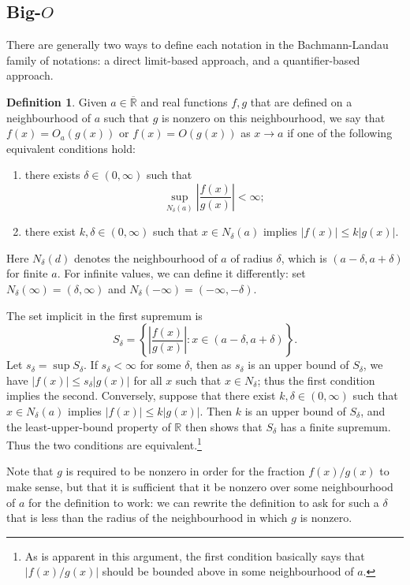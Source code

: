 \documentclass{article}
\theoremstyle{definition}
\newtheorem{definition}{Definition}
\newcommand\RR{\mathbb R}
\newcommand\RRE{\overline{\mathbb R}}
\newcommand\abs[1]{\left\lvert#1\right\rvert}
\begin{document}
\subsection{Big-$O$}\label{ssec:bigo}

There are generally two ways to define each notation in the Bachmann-Landau family of notations: a direct limit-based approach, and a quantifier-based approach.

\begin{definition}
    Given \(a\in\RRE\) and real functions \(f,g\) that are defined on a neighbourhood of \(a\) such that \(g\) is nonzero on this neighbourhood, we say that \(f(x) = O_a(g(x))\) or \(f(x) = O(g(x))\) as \(x\to a\) if one of the following equivalent conditions hold:
    \begin{enumerate}
        \item there exists \(\delta\in(0,\infty)\) such that
            \[\sup_{N_{\delta}(a)} \abs{\frac{f(x)}{g(x)}} < \infty;\]
        \item there exist \(k,\delta\in(0,\infty)\) such that \(x\in N_{\delta}(a)\) implies \(\abs{f(x)} \leq k\abs{g(x)}\).
    \end{enumerate}
\end{definition}

Here \(N_{\delta}(d)\) denotes the neighbourhood of \(a\) of radius \(\delta\), which is \((a-\delta,a+\delta)\) for finite \(a\).
For infinite values, we can define it differently: set \(N_{\delta}(\infty) = (\delta,\infty)\) and \(N_{\delta}(-\infty) = (-\infty,-\delta)\).

The set implicit in the first supremum is
\[S_{\delta} = \left\{\abs{\frac{f(x)}{g(x)}} : x \in (a-\delta,a+\delta)\right\}.\]
Let \(s_{\delta} = \sup S_{\delta}\).
If \(s_{\delta} < \infty\) for some \(\delta\), then as \(s_{\delta}\) is an upper bound of \(S_{\delta}\), we have \(\abs{f(x)} \leq s_{\delta}\abs{g(x)}\) for all \(x\) such that \(x\in N_{\delta}\); thus the first condition implies the second.
Conversely, suppose that there exist \(k,\delta\in(0,\infty)\) such that \(x\in N_{\delta}(a)\) implies \(\abs{f(x)} \leq k\abs{g(x)}\).
Then \(k\) is an upper bound of \(S_{\delta}\), and the least-upper-bound property of \(\RR\) then shows that \(S_{\delta}\) has a finite supremum.
Thus the two conditions are equivalent.\footnote{As is apparent in this argument, the first condition basically says that \(\abs{f(x)/g(x)}\) should be bounded above in some neighbourhood of \(a\).}

Note that \(g\) is required to be nonzero in order for the fraction \(f(x)/g(x)\) to make sense, but that it is sufficient that it be nonzero over some neighbourhood of \(a\) for the definition to work: we can rewrite the definition to ask for such a \(\delta\) that is less than the radius of the neighbourhood in which \(g\) is nonzero.
\end{document}
